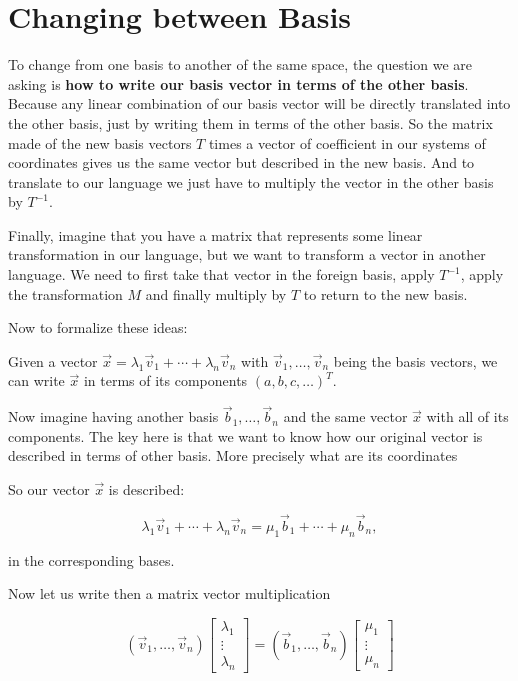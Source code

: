 \newpage
\section{Changing between Basis}

To change from one basis to another of the same space, the question we are asking is \textbf{how to write our basis vector 
in terms of the other basis}. Because any linear combination of our basis vector will be directly translated 
into the other basis, just by writing them in terms of the other basis. So the matrix made of the new basis vectors 
\(T\) times a vector of coefficient in our systems of coordinates gives us the same vector but described in the new basis.
And to translate to our language we just have to multiply the vector in the other basis by \(T^{-1}\).

Finally, imagine that you have a matrix that represents some linear transformation in our language, but we want to transform 
a vector in another language. We need to first take that vector in the foreign basis, apply \(T^{-1}\), apply the transformation \(M\) 
and finally multiply by \(T\) to return to the new basis.

Now to formalize these ideas:

Given a vector \(\vec{x} = \lambda_1 \vec{v}_1 + \cdots + \lambda_n \vec{v}_n\) 
with \(\vec{v}_1, \dots, \vec{v}_n\)
being the basis vectors, we can write \(\vec{x}\) in terms of its components \({(a, b, c, \dots)}^T\).

Now imagine having another basis \(\vec{b}_1, \dots, \vec{b}_n\) and the same vector \(\vec{x}\)
with all of its components. The key here is that we want to know how our original
vector is described in terms of other basis. More precisely what are its coordinates

So our vector \(\vec{x}\) is described:

\[
    \lambda_1 \vec{v}_1 + \cdots + \lambda_n \vec{v}_n = \mu_1 \vec{b}_1 + \cdots + \mu_n \vec{b}_n,
\]

in the corresponding bases.

Now let us write then a matrix vector multiplication

\[
    (\vec{v}_1, \dots, \vec{v}_ n) 
    \begin{bmatrix} \lambda_1 \\ \vdots \\ \lambda_n \end{bmatrix}
    =
    (\vec{b}_1, \dots, \vec{b}_ n) 
    \begin{bmatrix} \mu_1 \\ \vdots \\ \mu_n \end{bmatrix}
\]

